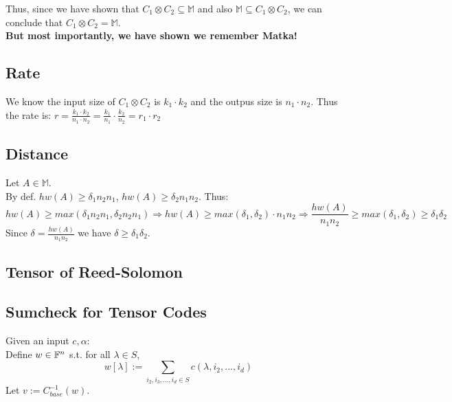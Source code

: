 Thus, since we have shown that $C_1\otimes C_2\subseteq\mathbb{M}$
and also $\mathbb{M}\subseteq C_1\otimes C_2$, we can conclude that
$C_1\otimes C_2=\mathbb{M}$.\\


\textbf{But most importantly, we have shown we remember Matka!}

\subsection{Rate}
We know the input size of $C_1\otimes C_2$ is $k_1\cdot k_2$ and the outpus size
is $n_1\cdot n_2$. Thus the rate is:
$r=\frac{k_1\cdot k_2}{n_1\cdot n_2}=\frac{k_1}{n_1}\cdot\frac{k_2}{n_2}=r_1\cdot r_2$

\subsection{Distance}
Let $A\in\mathbb{M}$.\\
By def. $hw(A)\geq \delta_1n_2n_1$, $hw(A)\geq \delta_2n_1n_2$.
Thus:
\[
    hw(A)\geq max(\delta_1n_2n_1, \delta_2n_2n_1)
    \Rightarrow hw(A)\geq max(\delta_1, \delta_2)\cdot n_1n_2
    \Rightarrow \frac{hw(A)}{n_1n_2}\geq max(\delta_1, \delta_2)\geq \delta_1\delta_2
\]
Since $\delta =\frac{hw(A)}{n_1n_2}$ we have $\delta \geq \delta_1\delta_2$.
\subsection{Tensor of Reed-Solomon}
\subsection{Sumcheck for Tensor Codes}
Given an input $c,\alpha$:\\
Define $w\in\mathbb{F}^n$ s.t. for all $\lambda\in S$,
\[w[\lambda]:=\sum_{i_2,i_3,...,i_d\in S}c(\lambda, i_2,...,i_d)\]
Let $v:=C_{base}^{-1}(w)$.\\


